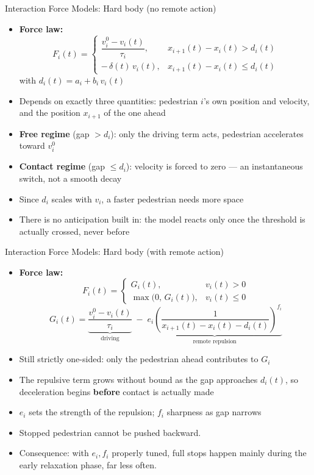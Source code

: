 \documentclass{beamer}
\begin{document}
\begin{frame}{Interaction Force Models: Hard body (no remote action)}
    \begin{itemize}
        \item \textbf{Force law:}
        \[
            F_i(t) =
            \begin{cases}
                \dfrac{v_i^0 - v_i(t)}{\tau_i}, & x_{i+1}(t) - x_i(t) > d_i(t) \\[10pt]
                -\,\delta(t)\,v_i(t), & x_{i+1}(t) - x_i(t) \le d_i(t)
            \end{cases}
        \]
        with $d_i(t) = a_i + b_i\,v_i(t)$
        \item Depends on exactly three quantities: pedestrian $i$'s own position and velocity, and the position $x_{i+1}$ of the one ahead
        \item \textbf{Free regime} (gap $> d_i$): only the driving term acts, pedestrian accelerates toward $v_i^0$
        \item \textbf{Contact regime} (gap $\le d_i$): velocity is forced to zero --- an instantaneous switch, not a smooth decay
        \item Since $d_i$ scales with $v_i$, a faster pedestrian needs more space
        \item There is no anticipation built in: the model reacts only once the threshold is actually crossed, never before
    \end{itemize}
\end{frame}


\begin{frame}{Interaction Force Models: Hard body (with remote action)}
    \begin{itemize}
        \item \textbf{Force law:}
        \[
            F_i(t) =
            \begin{cases}
                G_i(t), & v_i(t) > 0 \\[4pt]
                \max\big(0,\, G_i(t)\big), & v_i(t) \le 0
            \end{cases}
        \]
        \[
            G_i(t) = \underbrace{\frac{v_i^0 - v_i(t)}{\tau_i}}_{\text{driving}} \;-\; \underbrace{e_i\left(\frac{1}{x_{i+1}(t)-x_i(t)-d_i(t)}\right)^{f_i}}_{\text{remote repulsion}}
        \]
        \item Still strictly one-sided: only the pedestrian ahead contributes to $G_i$
        \item The repulsive term grows without bound as the gap approaches $d_i(t)$, so deceleration begins \textbf{before} contact is actually made
        \item $e_i$ sets the strength of the repulsion; $f_i$ sharpness as gap narrows
        \item  Stopped pedestrian cannot be pushed backward.
        \item Consequence: with $e_i, f_i$ properly tuned, full stops happen mainly during the early relaxation phase, far less often.
    \end{itemize}
\end{frame}
\end{document}
